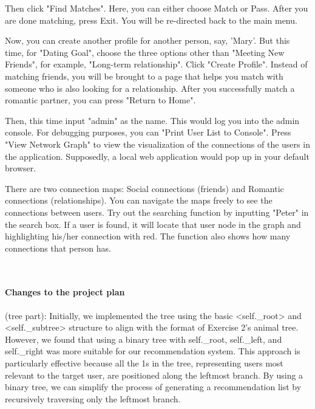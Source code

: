 \documentclass[fontsize=11pt]{article}
\begin{document}
Then click "Find Matches". Here, you can either choose Match or Pass. After you are done matching, press Exit. You will be re-directed back to the main menu.

Now, you can create another profile for another person, say, 'Mary'. But this time, for "Dating Goal", choose the three options other than "Meeting New Friends", for example, "Long-term relationship". Click "Create Profile". Instead of matching friends, you will be brought to a page that helps you match with someone who is also looking for a relationship. After you successfully match a romantic partner, you can press "Return to Home".

Then, this time input "admin" as the name. This would log you into the admin console. For debugging purposes, you can "Print User List to Console". Press "View Network Graph" to view the visualization of the connections of the users in the application. Supposedly, a local web application would pop up in your default browser.

There are two connection maps: Social connections (friends) and Romantic connections (relationships). You can navigate the maps freely to see the connections between users. Try out the searching function by inputting "Peter" in the search box. If a user is found, it will locate that user node in the graph and highlighting his/her connection with red. The function also shows how many connections that person has.


\\
\paragraph{Changes to the project plan}
(tree part): Initially, we implemented the tree using the basic <self.\_root> and <self.\_subtree> structure to align with the format of Exercise 2's animal tree. However, we found that using a binary tree with self.\_root, self.\_left, and self.\_right was more suitable for our recommendation system. This approach is particularly effective because all the 1s in the tree, representing users most relevant to the target user, are positioned along the leftmost branch. By using a binary tree, we can simplify the process of generating a recommendation list by recursively traversing only the leftmost branch.


\\
\end{document}

